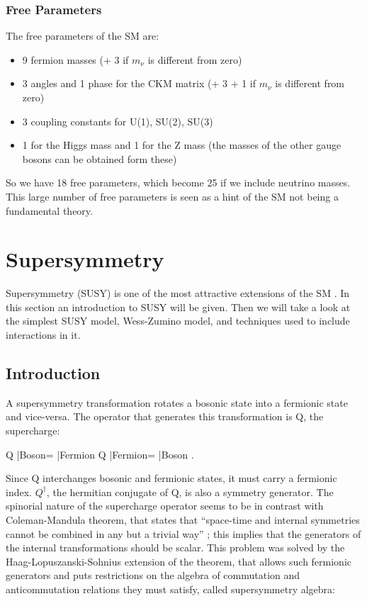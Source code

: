 \subsubsection*{Free Parameters}
The free parameters of the SM are:
\begin{itemize}
\item 9 fermion masses (+ 3 if $m_\nu$ is different from zero)
\item 3 angles and 1 phase for the CKM matrix (+ 3 + 1 if $m_\nu$ is different from zero)
\item 3 coupling constants for U(1), SU(2), SU(3)
\item 1 for the Higgs mass and 1 for the Z mass (the masses of the other gauge bosons can be obtained form these)
\end{itemize}
So we have 18 free parameters, which become 25 if we include neutrino masses. This large number of free parameters is seen as a hint of the SM not being a fundamental theory.



\section{Supersymmetry}
\label{sec:SUSY}

Supersymmetry (SUSY) is one of the most attractive extensions of the SM \cite{martin:primer}. In this section an introduction to SUSY will be given. Then we will take a look at the simplest SUSY model, Wess-Zumino model, and techniques used to include interactions in it.


\subsection{Introduction}
\label{sec:susyintro}

A supersymmetry transformation rotates a bosonic state into a fermionic state and vice-versa. The operator that generates this transformation is Q, the supercharge:

\beq
Q |{\rm Boson}\rangle = |{\rm Fermion }\rangle \qquad\qquad
Q |{\rm Fermion}\rangle = |{\rm Boson }\rangle .
\eeq

Since Q interchanges bosonic and fermionic states, it must carry a fermionic index. $Q^\dagger$, the hermitian conjugate of Q, is also a symmetry generator. The spinorial nature of the  supercharge operator seems to be in contrast with Coleman-Mandula theorem, that states that ``space-time and internal symmetries cannot be combined in any but a trivial way'' \cite{coleman:mandula}; this implies that the generators of the internal transformations should be scalar. 
This problem was solved by the Haag-Lopuszanski-Sohnius extension of the theorem, that allows such fermionic generators and puts restrictions on the algebra of commutation and anticommutation relations they must satisfy, called supersymmetry algebra:

